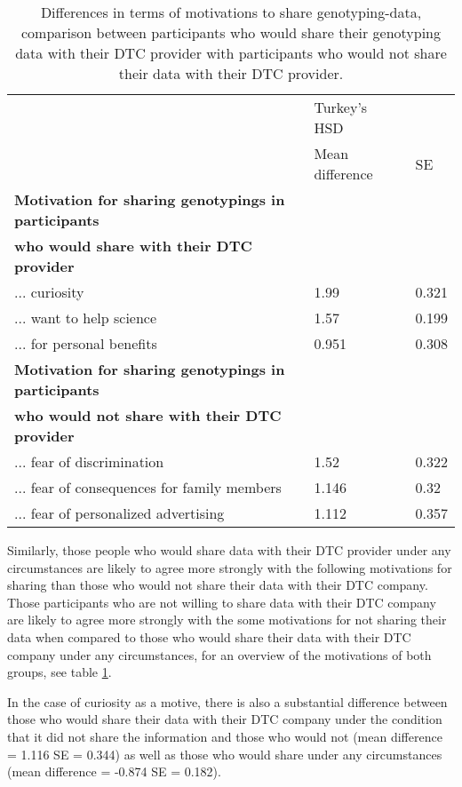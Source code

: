 \documentclass[10pt]{article}
\begin{document}
\begin{table}
\begin{tabular}{|l|l|l|}
\hline
& Turkey's HSD & \\ \cline{2-3}
& Mean difference & SE \\ \hline
\textbf{Motivation for sharing genotypings in participants} & & \\
\textbf{who would share with their DTC provider} & & \\ \hline
... curiosity & 1.99 & 0.321 \\
... want to help science & 1.57 & 0.199 \\
... for personal benefits & 0.951 & 0.308 \\ \hline
\textbf{Motivation for sharing genotypings in participants} & & \\
\textbf{who would not share with their DTC provider} & & \\ \hline
... fear of discrimination & 1.52 & 0.322 \\
... fear of consequences for family members & 1.146 & 0.32 \\
... fear of personalized advertising & 1.112 & 0.357 \\ \hline
\end{tabular}
\caption{Differences in terms of motivations to share genotyping-data, comparison between participants who would share their genotyping data with their DTC provider with participants who would not share their data with their DTC provider.}
\label{tab:motivations2}
\end{table}

Similarly, those people who would share data with their DTC provider under any circumstances are likely to agree more strongly with 
the following motivations for sharing than those who would not share their data with their DTC company.
Those participants who are not willing to share data with their DTC company are likely to agree more strongly with the some motivations 
for not sharing their data when compared to those who would share their data with their DTC company under any circumstances, for an overview of the motivations of both groups, see table \ref{tab:motivations2}.

In the case of curiosity as a motive, there is also a substantial difference between those who would share their data with their DTC company under the condition that it did not share the information and those who would not (mean difference = 1.116 SE = 0.344) as well as those who would share under any circumstances (mean difference = -0.874 SE = 0.182).
\end{document}
